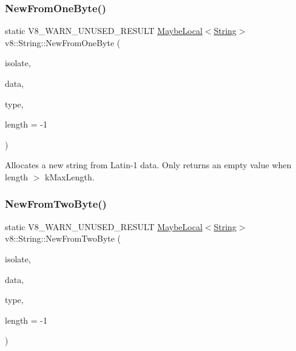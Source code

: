 \subsubsection{\texorpdfstring{New\+From\+One\+Byte()}{NewFromOneByte()}}
{\footnotesize\ttfamily static V8\+\_\+\+W\+A\+R\+N\+\_\+\+U\+N\+U\+S\+E\+D\+\_\+\+R\+E\+S\+U\+LT \mbox{\hyperlink{classv8_1_1MaybeLocal}{Maybe\+Local}}$<$\mbox{\hyperlink{classv8_1_1String}{String}}$>$ v8\+::\+String\+::\+New\+From\+One\+Byte (\begin{DoxyParamCaption}\item[{Isolate $\ast$}]{isolate,  }\item[{const uint8\+\_\+t $\ast$}]{data,  }\item[{\mbox{\hyperlink{namespacev8_ac9163ab12fb3b2a95907a3a0367c6095}{v8\+::\+New\+String\+Type}}}]{type,  }\item[{int}]{length = {\ttfamily -\/1} }\end{DoxyParamCaption})\hspace{0.3cm}{\ttfamily [static]}}

Allocates a new string from Latin-\/1 data. Only returns an empty value when length $>$ k\+Max\+Length. \mbox{\label{classv8_1_1String_aaad4c7c856c29d79db85994c301fe601}} 
\subsubsection{\texorpdfstring{New\+From\+Two\+Byte()}{NewFromTwoByte()}}
{\footnotesize\ttfamily static V8\+\_\+\+W\+A\+R\+N\+\_\+\+U\+N\+U\+S\+E\+D\+\_\+\+R\+E\+S\+U\+LT \mbox{\hyperlink{classv8_1_1MaybeLocal}{Maybe\+Local}}$<$\mbox{\hyperlink{classv8_1_1String}{String}}$>$ v8\+::\+String\+::\+New\+From\+Two\+Byte (\begin{DoxyParamCaption}\item[{Isolate $\ast$}]{isolate,  }\item[{const uint16\+\_\+t $\ast$}]{data,  }\item[{\mbox{\hyperlink{namespacev8_ac9163ab12fb3b2a95907a3a0367c6095}{v8\+::\+New\+String\+Type}}}]{type,  }\item[{int}]{length = {\ttfamily -\/1} }\end{DoxyParamCaption})\hspace{0.3cm}{\ttfamily [static]}}

